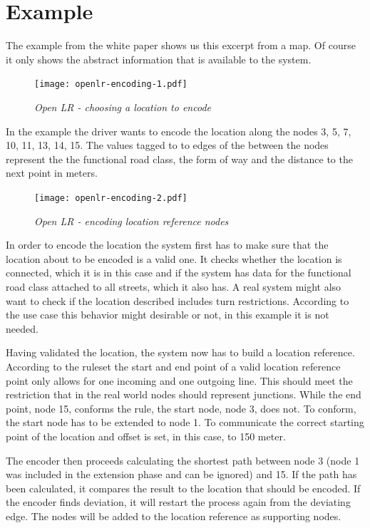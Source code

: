 \section{Example}
\label{sec:open-lr-example}

The example from the white paper shows us this excerpt from a map. Of course it only shows the abstract information that is available to the system.

\begin{figure}
  \texttt{[image: openlr-encoding-1.pdf]}%
  \caption{\emph{Open LR - choosing a location to encode}}%
  \label{fig:openlr-encoding-1}%
\end{figure}

In the example the driver wants to encode the location along the nodes 3, 5, 7, 10, 11, 13, 14, 15. The values tagged to to edges of the between the nodes represent the the functional road class, the form of way and the distance to the next point in meters.

\begin{figure}
  \texttt{[image: openlr-encoding-2.pdf]}%
  \caption{\emph{Open LR - encoding location reference nodes}}%
  \label{fig:openlr-encoding-2}%
\end{figure}

In order to encode the location the system first has to make sure that the location about to be encoded is a valid one. It checks whether the location is connected, which it is in this case and if the system has data for the functional road class attached to all streets, which it also has. A real system might also want to check if the location described includes turn restrictions. According to the use case this behavior might desirable or not, in this example it is not needed.

Having validated the location, the system now has to build a location reference. According to the ruleset the start and end point of a valid location reference point only allows for one incoming and one outgoing line. This should meet the restriction that in the real world nodes should represent junctions. While the end point, node 15, conforms the rule, the start node, node 3, does not. To conform, the start node has to be extended to node 1. To communicate the correct starting point of the location and offset is set, in this case, to 150 meter.

The encoder then proceeds calculating the shortest path between node 3 (node 1 was included in the extension phase and can be ignored) and 15. If the path has been calculated, it compares the result to the location that should be encoded. If the encoder finds deviation, it will restart the process again from the deviating edge. The nodes will be added to the location reference as supporting nodes.

